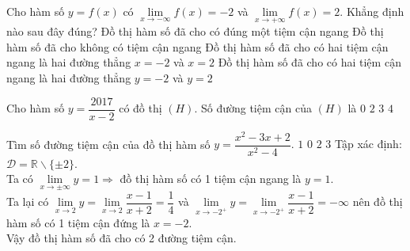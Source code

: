 \begin{ex}
\begin{ex}%
    Cho hàm số $y=f(x)$ có $\lim\limits_{x\to -\infty} f(x)= -2$ và $\lim\limits_{x\to +\infty} f(x)= 2$. Khẳng định nào sau đây đúng?
    \choice
    {Đồ thị hàm số đã cho có đúng một tiệm cận ngang}
    {Đồ thị hàm số đã cho không có tiệm cận ngang}
    {Đồ thị hàm số đã cho có hai tiệm cận ngang là hai đường thẳng $x=-2$ và $x=2$}
    {\True Đồ thị hàm số đã cho có hai tiệm cận ngang là hai đường thẳng $y=-2$ và $y=2$}
\end{ex}

\begin{ex}%
    Cho hàm số $y= \dfrac{2017}{x-2}$ có đồ thị $(H)$. Số đường tiệm cận của $(H)$ là
    \choice
    {$0$}
    {\True $2$}
    {$3$}
    {$4$}
\end{ex}

\begin{ex}
    Tìm số đường tiệm cận của đồ thị hàm số $ y = \dfrac{x^2 - 3x + 2}{x^2 - 4}. $
    \choice
    {$1$}
    {$ 0$}
    {\True $2$}
    {$3$}
    \loigiai
    {
        Tập xác định: $ \mathscr D = \mathbb{R} \backslash \{\pm2 \} $.\\
        Ta có $ \lim \limits_{x \to \pm  \infty} y = 1 \Rightarrow  $ đồ thị hàm số có 1 tiệm cận ngang là $ y = 1. $\\
        Ta lại có $\lim \limits_{x \to 2} y =  \lim \limits_{x \to 2} \dfrac{x-1}{x+2} = \dfrac{1}{4} $ và $\lim \limits_{x \to -2^+} y =  \lim \limits_{x \to -2^+} \dfrac{x-1}{x+2} = -\infty$ nên đồ thị hàm số có 1 tiệm cận đứng là $ x = -2. $\\
        Vậy đồ thị hàm số đã cho có 2 đường tiệm cận.
    }
\end{ex}



\end{ex}
